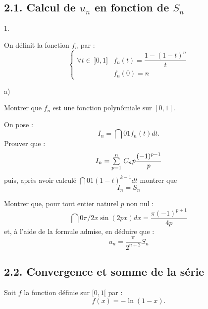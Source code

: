 \documentclass[11pt]{article}%
\begin{document}
\subsection*{2.1. Calcul de $u_{n}$ en fonction de $S_{n}$}

\begin{noliste}{1.}
 \setlength{\itemsep}{4mm}
\item On définit la fonction $f_{n}$ par :
\[
\left\{ 
\begin{array}{cc}
\forall t\in \ ]0,1] & f_{n}(t) = \dfrac{1-(1-t)^{n}}{t} \\
 & f_{n}(0) = n
\end{array}
\right.
\]

\begin{noliste}{a)}
 \setlength{\itemsep}{2mm}
\item Montrer que $f_{n}$ est une fonction polynômiale sur $[0,1].$

\item On pose :
\[
I_{n} = \dint{0}{1}f_{n}(t)dt.
\]
Prouver que :
\[
I_{n} = {\textstyle\sum\limits_{p = 1}^{n}}\hspace{.1cm}C_{n}{p}\dfrac{(-1)^{p-1}}{p}
\]
puis, après avoir calculé $\dint{0}{1}(1-t)^{k-1}dt$ montrer que 
\[
I_{n} = S_{n}
\]
\end{noliste}

\item Montrer que, pour tout entier naturel $p$ non nul :
\[
\dint{0}{\pi /2}x\sin (2px)dx = \dfrac{\pi (-1)^{p + 1}}{4p}
\]
et, à l'aide de la formule admise, en déduire que :
\[
u_{n} = \dfrac{\pi }{2^{n + 2}}S_{n}
\]
\end{noliste}

\subsection*{2.2. Convergence et somme de la série}

Soit $f$ la fonction définie sur $[0,1[$ par :
\[
f(x) = -\ln (1-x).
\]
\end{document}
